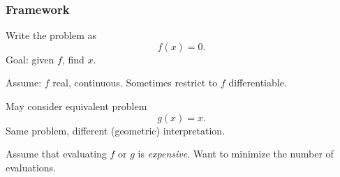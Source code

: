 \documentclass{beamer}
\begin{document}
\begin{frame}
  \frametitle{Framework}

  Write the problem as
  \begin{equation*}
    f(x) = 0.
  \end{equation*}
  Goal: given $f$, find $x$. \pause

  \vspace{1ex}

  Assume: $f$ real, continuous. Sometimes restrict to $f$ differentiable. \pause


  \vspace{1ex}

  May consider equivalent problem
  \begin{equation*}
    g(x) = x.
  \end{equation*}
  Same problem, different (geometric) interpretation. \pause

  \vspace{1ex}

  Assume that evaluating $f$ or $g$ is \emph{expensive}. Want to minimize the number of evaluations.

\end{frame}
\end{document}

